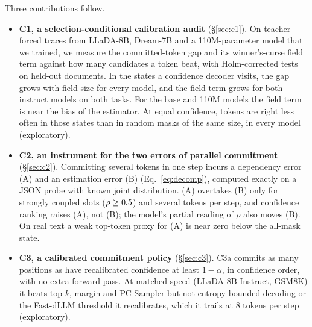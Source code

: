 Three contributions follow.
\begin{itemize}

\item \textbf{C1, a selection-conditional calibration audit} (\S\ref{sec:c1}).
  On teacher-forced traces from LLaDA-8B, Dream-7B and a 110M-parameter model that we trained,
  we measure the committed-token gap and its winner's-curse field term against how many candidates a token beat,
  with Holm-corrected tests on held-out documents.
  In the states a confidence decoder visits, the gap grows with field size for every model, and the field term grows for both instruct models on both tasks.
  For the base and 110M models the field term is near the bias of the estimator. At
  equal confidence, tokens are right less often in those states than in random masks of the same size, in every model (exploratory).
  
\item \textbf{C2, an instrument for the two errors of parallel commitment}
  (\S\ref{sec:c2}). Committing several tokens in one step incurs a dependency error (A) and an
  estimation error (B) (Eq.~\ref{eq:decomp}), computed exactly on a JSON probe with known joint
  distribution. (A) overtakes (B) only for strongly coupled slots
  ($\rho\ge0.5$) and several tokens per step, and confidence ranking raises (A),
  not (B); the model's partial reading of $\rho$ also moves (B). On real text a weak top-token proxy for (A) is near zero
  below the all-mask state.
\item \textbf{C3, a calibrated commitment policy} (\S\ref{sec:c3}). C3a commits as many
  positions as have recalibrated confidence at least $1-\alpha$, in
  confidence order, with no extra forward pass. At matched speed
  (LLaDA-8B-Instruct, GSM8K) it beats top-$k$, margin and PC-Sampler but not entropy-bounded
  decoding or the Fast-dLLM threshold it recalibrates, which it trails at 8 tokens per step
  (exploratory).
\end{itemize}

